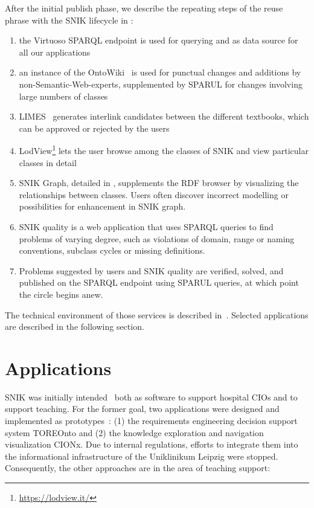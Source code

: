 \documentclass[sw]{iosart2x}
\renewcommand{\citet}{\cite}%
\renewcommand{\citep}{\cite}%
\begin{document}
After the initial publish phase, we describe the repeating steps of the reuse phrase with the SNIK lifecycle in :
\begin{enumerate}
\item the Virtuoso SPARQL endpoint is used for querying and as data source for all our applications  
\item an instance of the OntoWiki~\citep{ontowiki} is used for punctual changes and additions by non-Semantic-Web-experts, supplemented by SPARUL for changes involving large numbers of classes 
\item LIMES~\citep{limes} generates interlink candidates between the different textbooks, which can be approved or rejected by the users
\item LodView\footnote{\url{https://lodview.it/}} lets the user browse among the classes of SNIK and view particular classes in detail
\item SNIK Graph, detailed in , supplements the RDF browser by visualizing the relationships between classes.
Users often discover incorrect modelling or possibilities for enhancement in SNIK graph.
\item SNIK quality is a web application that uses SPARQL queries to find problems of varying degree, such as violations of domain, range or naming conventions, subclass cycles or missing definitions.
\item Problems suggested by users and SNIK quality are verified, solved, and published on the SPARQL endpoint using SPARUL queries, at which point the circle begins anew. 
\end{enumerate}

The technical environment of those services is described in~\citet{sniktec}.
Selected applications are described in the following section.

\section{Applications}
SNIK was initially intended~\citep{domaene} both as  software to support hospital CIOs and to support teaching.
For the former goal, two applications were designed and implemented as prototypes~\citep{toreonto}: (1) the requirements engineering decision support system TOREOnto and (2) the knowledge exploration and navigation visualization CIONx.
Due to internal regulations, efforts to integrate them into the informational infrastructure of the Uniklinikum Leipzig were stopped.
Consequently, the other approaches are in the area of teaching support:
\end{document}
